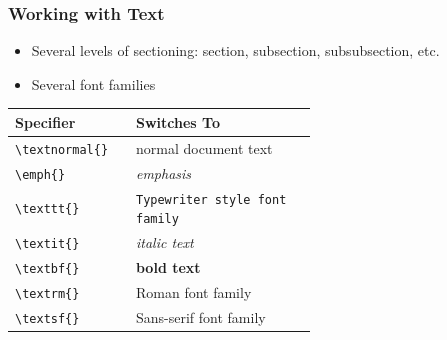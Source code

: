 \documentclass[aspectratio=169]{beamer}
\begin{document}
\begin{frame}[fragile]
\frametitle{Working with Text}
    \begin{itemize}
        \item Several levels of sectioning: section, subsection, subsubsection, etc.
        \item Several font families
    \end{itemize}
    \medskip
    \small
    \begin{tabular}{l p{0.6\linewidth} }
         \textbf{Specifier} &  \textbf{Switches To}\\ \hline
         \verb|\textnormal{}|  & normal document text\\
         \verb|\emph{}| & \emph{emphasis}\\
         \verb|\texttt{}| & \texttt{Typewriter style font family}\\
         \verb|\textit{}| & \textit{italic text}\\
         \verb|\textbf{}| & \textbf{bold text}\\
         \verb|\textrm{}| & \textrm{Roman font family}\\
         \verb|\textsf{}| & \textsf{Sans-serif font family}\\         
    \end{tabular}
    \normalsize
\end{frame}


\end{document}
